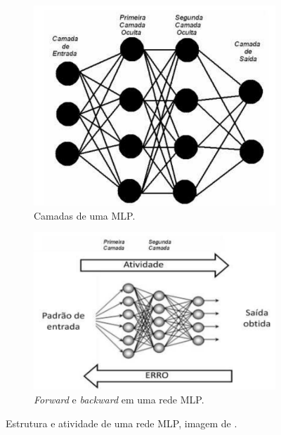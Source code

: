 \begin{figure}[h]
    \centering
    \begin{subfigure}{0.40\textwidth}
      \centering
      \includegraphics[width=\linewidth]{figuras/MLP/rede_MLP.png}
      \caption{Camadas de uma MLP.}
      \label{fig:subfigura1}
    \end{subfigure}
    \hfill
    \begin{subfigure}{0.45\textwidth}
      \centering
      \includegraphics[width=\linewidth]{figuras/MLP/atividade_MLP.png}
      \caption{\textit{Forward} e \textit{backward} em uma rede MLP.}
      \label{fig:subfigura2}
    \end{subfigure}
    \caption{Estrutura e atividade de uma rede MLP, imagem de \cite{su12114776}.}
    \label{fig:subfiguras}
  \end{figure}

